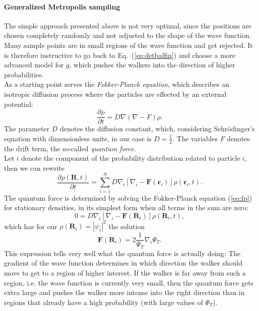 \paragraph*{Generalized Metropolis sampling}
The simple approach presented above is not very optimal, since the positions are chosen completely randomly and not adjusted to the shape of the wave function. Many sample points are in small regions of the wave function and get rejected. It is therefore instructive to go back to Eq.~(\ref{eq:detbalfin}) and choose a more advanced model for $g$, which pushes the walkers into the direction of higher probabilities.\\
As a starting point serves the \textit{Fokker-Planck equation}, which describes an isotropic diffusion process where the particles are effected by an external potential:
\begin{equation}
\frac{\partial \rho}{\partial t} = D\nabla(\nabla - F)\rho.
\label{eq:fp}
\end{equation}
The parameter $D$ denotes the diffusion constant, which,
considering Schr\"odinger's equation with dimensionless units, in our case is $D = \frac{1}{2}$.
The variables $F$ denotes the drift term, the so-called \textit{quantum force}.\\
Let $i$ denote the component of the probability distribution related to particle $i$, then we can rewrite
\begin{equation}
\frac{\partial \rho(\mathbf{R}, t)}{\partial t} = \sum\limits_{i=1}^N D\nabla_i\left[\nabla_i - \mathbf{F}(\mathbf{r}_i)\right]\rho(\mathbf{r}_i,t).
\label{eq:fokplank}
\end{equation}
The quantum force is determined by solving the Fokker-Planck equation (\ref{eq:fp}) for stationary densities, in its simplest form when all terms in the sum are zero:
\[
0 = D\nabla_i\left[\nabla_i - \mathbf{F}(\mathbf{R}_i)\right]\rho(\mathbf{R}_i,t),
\]
which has for our $\rho(\mathbf{R}_i) = \left|\psi_i\right|^2$ the solution
\[
\mathbf{F}(\mathbf{R}_i) = 2 \frac{1}{\Psi_T}\nabla_i \Psi_T.
\]
This expression tells very well what the quantum force is actually doing: The gradient of the wave function determines in which direction the walker should move to get to a region of higher interest. If the walker is far away from such a region, i.e. the wave function is currently very small, then the quantum force gets extra large and pushes the walker more intense into the right direction than in regions that already have a high probability (with large values of $\Psi_T$).

